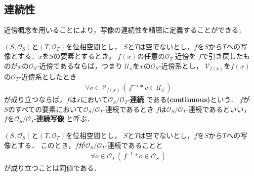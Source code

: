 \subsection{連続性}
	近傍概念を用いることにより，写像の連続性を精密に定義することができる．
	
	\begin{screen}
		\begin{dfn}[連続]
			$(S,\mathscr{O}_{S})$と$(T,\mathscr{O}_{T})$を位相空間とし，
			$S$と$T$は空でないとし，$f$を$S$から$T$への写像とする．$x$を$S$の要素とするとき，
			$f(x)$の任意の$\mathscr{O}_{T}$-近傍を
			$f$で引き戻したものが$x$の$\mathscr{O}_{S}$-近傍であるならば，つまり
			$\mathcal{U}_{x}$を$x$の$\mathscr{O}_{S}$-近傍系とし，
			$\mathcal{V}_{f(x)}$を$f(x)$の$\mathscr{O}_{T}$-近傍系としたとき
			\begin{align}
				\forall v \in \mathcal{V}_{f(x)}\,
				\left(\, f^{-1} \ast v \in \mathcal{U}_{x}\, \right)
			\end{align}
			が成り立つならば，$f$は$x$において$\mathscr{O}_{S}/\mathscr{O}_{T}$-{\bf 連続}
			である{\bf (continuous)}という．
			$f$が$S$のすべての要素において$\mathscr{O}_{S}/\mathscr{O}_{T}$-連続であるとき
			$f$は$\mathscr{O}_{S}/\mathscr{O}_{T}$-連続であるといい，
			$f$を$\mathscr{O}_{S}/\mathscr{O}_{T}$-{\bf 連続写像}
			と呼ぶ．
		\end{dfn}
	\end{screen}
	
	\begin{screen}
		\begin{thm}[連続写像は開集合を開集合に引き戻す]
		\label{thm:continuous_iff_preimage_of_open_sets_are_open}
		\label{thm:continuous_on_every_point_iff_continuous}
			$(S,\mathscr{O}_{S})$と$(T,\mathscr{O}_{T})$を位相空間とし，
			$S$と$T$は空でないとし，$f$を$S$から$T$への写像とする．
			このとき，$f$が$\mathscr{O}_{S}/\mathscr{O}_{T}$-連続であることと
			\begin{align}
				\forall o \in \mathscr{O}_{T}\, 
				\left(\, f^{-1} \ast o \in \mathscr{O}_{S}\, \right)
			\end{align}
			が成り立つことは同値である．
		\end{thm}
	\end{screen}
	
